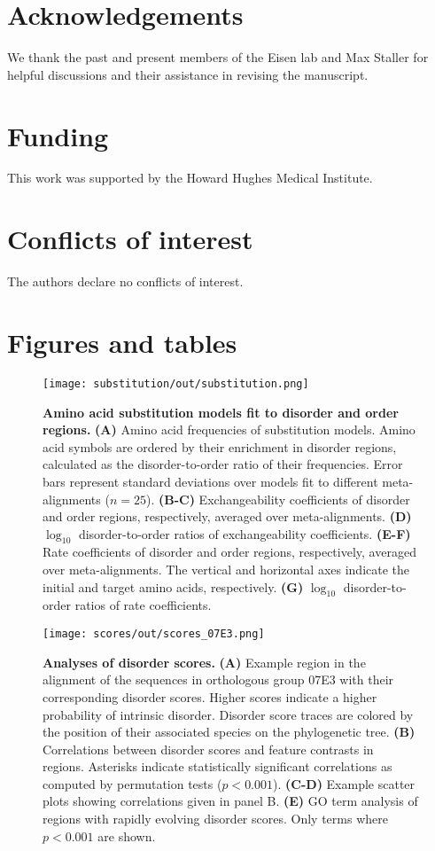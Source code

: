 \section{Acknowledgements}
We thank the past and present members of the Eisen lab and Max Staller for helpful discussions and their assistance in revising the manuscript.

\section{Funding}
This work was supported by the Howard Hughes Medical Institute.

\section{Conflicts of interest}
The authors declare no conflicts of interest.

\clearpage
\printbibliography

\clearpage
\section*{Figures and tables}

\begin{figure}[h!]
\texttt{[image: substitution/out/substitution.png]}
\centering
\caption{\textbf{Amino acid substitution models fit to disorder and order regions.}
\textbf{(A)} Amino acid frequencies of substitution models. Amino acid symbols are ordered by their enrichment in disorder regions, calculated as the disorder-to-order ratio of their frequencies. Error bars represent standard deviations over models fit to different meta-alignments ($n = 25$).
\textbf{(B-C)} Exchangeability coefficients of disorder and order regions, respectively, averaged over meta-alignments. \textbf{(D)} $\log_{10}$ disorder-to-order ratios of exchangeability coefficients.
\textbf{(E-F)} Rate coefficients of disorder and order regions, respectively, averaged over meta-alignments. The vertical and horizontal axes indicate the initial and target amino acids, respectively.
\textbf{(G)} $\log_{10}$ disorder-to-order ratios of rate coefficients.}
\label{fig:substitution}
\end{figure}

\begin{figure}[h!]
\texttt{[image: scores/out/scores\_07E3.png]}
\centering
\caption{\textbf{Analyses of disorder scores.}
\textbf{(A)} Example region in the alignment of the sequences in orthologous group 07E3 with their corresponding disorder scores. Higher scores indicate a higher probability of intrinsic disorder. Disorder score traces are colored by the position of their associated species on the phylogenetic tree.
\textbf{(B)} Correlations between disorder scores and feature contrasts in regions. Asterisks indicate statistically significant correlations as computed by permutation tests ($p < 0.001$).
\textbf{(C-D)} Example scatter plots showing correlations given in panel B.
\textbf{(E)} GO term analysis of regions with rapidly evolving disorder scores. Only terms where $p < 0.001$ are shown.}
\label{fig:scores}
\end{figure}

